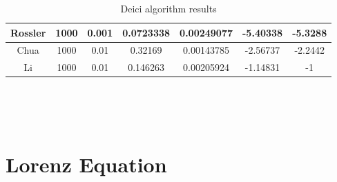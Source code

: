 \begin{table}
\begin{tabular}[h]{||c c c c c c c||}
                    \hline
                    Rossler & 1000 & 0.001 & 0.0723338 & 0.00249077 & -5.40338 & -5.3288\\
                    \hline
                    Chua    & 1000 & 0.01  & 0.32169   & 0.00143785 & -2.56737 & -2.2442\\
                    \hline
                    Li      & 1000 & 0.01 & 0.146263 & 0.00205924 & -1.14831 & -1\\[1ex]
                    \hline
                \end{tabular}\\
                \caption{Deici algorithm results}\label{table:deici}
            \end{table}\\

        \section{Lorenz Equation}

